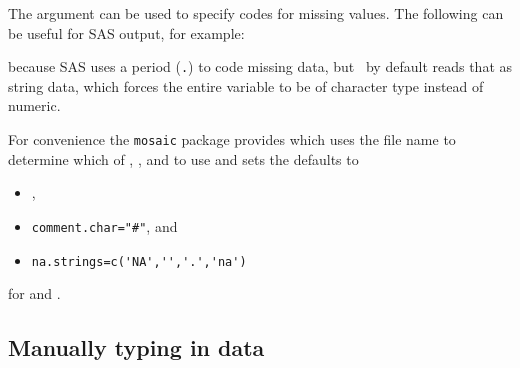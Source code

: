 The  argument can be used to specify
codes for missing values.  
The following can be useful for SAS output, for example:
\begin{knitrout}
\end{knitrout}

because SAS uses a period (\verb!.!) to code missing data, but \R\ by default
reads that as string data, which forces the entire variable to be of character 
type instead of numeric.

For convenience the \verb!mosaic! package provides  which
uses the file name to determine which of ,
, and  to use and sets the defaults
to 
\begin{itemize}
\item
{}, 
\item
\verb!comment.char="#"!, and 
\item
\verb!na.strings=c('NA','','.','na')! 
\end{itemize}
for  and .

\begin{knitrout}
\end{knitrout}


\subsection{Manually typing in data}

